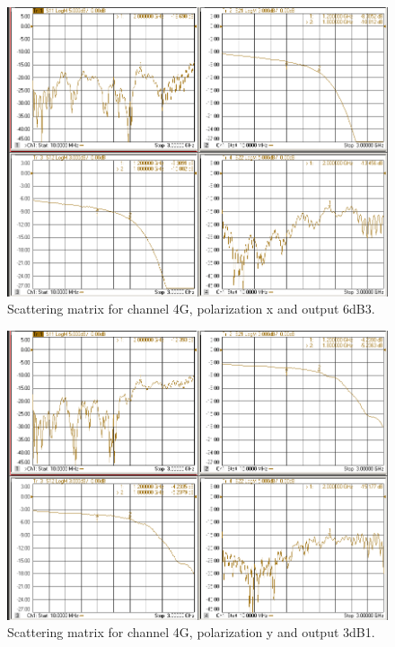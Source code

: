 \documentclass[12pt,a4paper,oneside]{article}
\begin{document}
\begin{figure}[H]
\centering
\includegraphics[width=0.9\linewidth]{VNA_results/4Gx_6dB3.png}
\caption{Scattering matrix for channel 4G, polarization x and output 6dB3.}
\label{fig:4Gx_6dB3}
\end{figure}


\begin{figure}[H]
\centering
\includegraphics[width=0.9\linewidth]{VNA_results/4Gy_3dB1.png}
\caption{Scattering matrix for channel 4G, polarization y and output 3dB1.}
\label{fig:4Gy_3dB1}
\end{figure}
\end{document}
